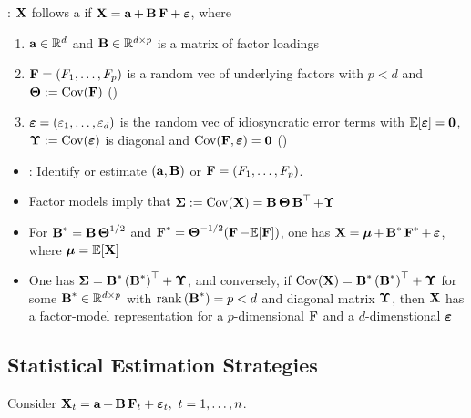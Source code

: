 : $\X$ follows a  if $\X=\a+\B \vect{F}+\vect{\varepsilon}$, where
\begin{enumerate}[label = (\arabic*), leftmargin=*]
    \item $\a \in \mathbb{R}^{d}$ and $\B \in \mathbb{R}^{d \times p}$ is a matrix of factor loadings
    \item $\vect{F}=\left(F_{1}, \ldots, F_{p}\right)$ is a random vec of underlying factors with $p<d$ and $\vect{\Theta}:=\operatorname{Cov}(\vect{F})$ ()
    \item $\vect{\varepsilon}=\left(\varepsilon_{1}, \ldots, \varepsilon_{d}\right)$ is the random vec of idiosyncratic error terms with $\mathbb{E}[\vect{\varepsilon}]=\vect{0}$, $\vect{\Upsilon}:=\operatorname{Cov}(\vect{\varepsilon})$ is diagonal and $\operatorname{Cov}(\vect{F}, \vect{\varepsilon})=\vect{0}$ ()
\end{enumerate}




\begin{itemize}[leftmargin=*]
    \item {}: Identify or estimate $(\a, \B)$ or $\vect{F}=\left(F_{1}, \ldots, F_{p}\right)$.
    \item Factor models imply that $\mSigma:=\operatorname{Cov}(\X)=\B \vect{\Theta} \B^{\T}+\vect{\Upsilon}$
    \item For $\B^{*}=\B \vect{\Theta}^{1 / 2}$ and $\F^{*}=\mTheta^{-1 / 2}(\F-\mathbb{E}[\F])$, one has
$
\X=\mmu+\B^{*} \F^{*}+\mvarepsilon$, where $\mmu=\mathbb{E}[\X]
$
    \item One has $\mSigma=\B^{*}\left(\B^{*}\right)^{\T}+\mUpsilon$, and conversely, if $\operatorname{Cov}(\X)=\B^{*}\left(\B^{*}\right)^{\T}+\mUpsilon$ for some $\B^{*} \in \mathbb{R}^{d \times p}$ with $\operatorname{rank}\left(\B^{*}\right)=p<d$ and diagonal matrix $\mUpsilon$, then $\X$ has a factor-model representation for a $p$-dimensional $\F$ and a $d$-dimenstional $\mvarepsilon$
\end{itemize}








\subsection*{Statistical Estimation Strategies}
Consider $\X_{t}=\a+\B \vect{F}_{t}+\vect{\varepsilon}_{t},\ t=1, \ldots, n$.

